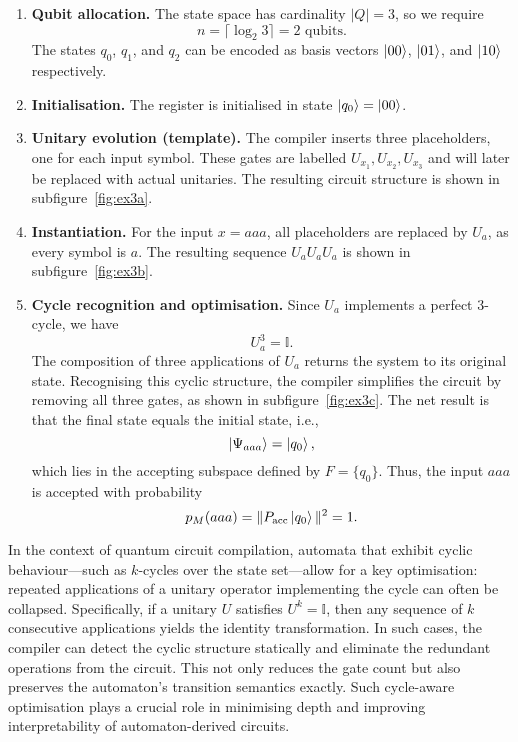 \begin{enumerate}
  \item \textbf{Qubit allocation.} The state space has cardinality $|Q| = 3$, so we require
  \[
  n = \lceil \log_2 3 \rceil = 2 \text{ qubits}.
  \]
  The states $q_0$, $q_1$, and $q_2$ can be encoded as basis vectors $\ket{00}$, $\ket{01}$, and $\ket{10}$ respectively.

  \item \textbf{Initialisation.} The register is initialised in state $\ket{q_0} = \ket{00}$.

  \item \textbf{Unitary evolution (template).} The compiler inserts three placeholders, one for each input symbol. These gates are labelled $\boxed{U_{x_1}}, \boxed{U_{x_2}}, \boxed{U_{x_3}}$ and will later be replaced with actual unitaries. The resulting circuit structure is shown in subfigure~\ref{fig:ex3a}.

  \item \textbf{Instantiation.} For the input $x = aaa$, all placeholders are replaced by $U_a$, as every symbol is $a$. The resulting sequence $U_a U_a U_a$ is shown in subfigure~\ref{fig:ex3b}.

  \item \textbf{Cycle recognition and optimisation.} Since $U_a$ implements a perfect 3-cycle, we have
  \[
  U_a^3 = \mathbb{I}.
  \]
  The composition of three applications of $U_a$ returns the system to its original state. Recognising this cyclic structure, the compiler simplifies the circuit by removing all three gates, as shown in subfigure~\ref{fig:ex3c}. The net result is that the final state equals the initial state, i.e.,
  \[
  \ket{\Psi_{aaa}} = \ket{q_0},
  \]
  which lies in the accepting subspace defined by $F = \{q_0\}$. Thus, the input $aaa$ is accepted with probability
  \[
  p_M(aaa) = \|P_{\text{acc}} \ket{q_0}\|^2 = 1.
  \]
\end{enumerate}

In the context of quantum circuit compilation, automata that exhibit cyclic behaviour—such as $k$-cycles over the state set—allow for a key optimisation: repeated applications of a unitary operator implementing the cycle can often be collapsed. Specifically, if a unitary $U$ satisfies $U^k = \mathbb{I}$, then any sequence of $k$ consecutive applications yields the identity transformation. In such cases, the compiler can detect the cyclic structure statically and eliminate the redundant operations from the circuit. This not only reduces the gate count but also preserves the automaton's transition semantics exactly. Such cycle-aware optimisation plays a crucial role in minimising depth and improving interpretability of automaton-derived circuits.


